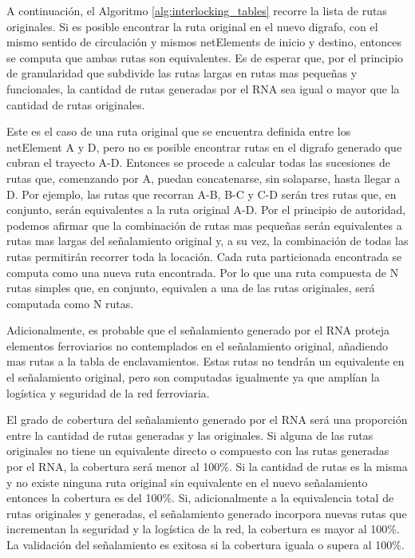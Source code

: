 	A continuación, el Algoritmo \ref{alg:interlocking_tables} recorre la lista de rutas originales. Si es posible encontrar la ruta original en el nuevo digrafo, con el mismo sentido de circulación y mismos netElements de inicio y destino, entonces se computa que ambas rutas son equivalentes. Es de esperar que, por el principio de granularidad que subdivide las rutas largas en rutas mas pequeñas y funcionales, la cantidad de rutas generadas por el RNA sea igual o mayor que la cantidad de rutas originales.
	
	Este es el caso de una ruta original que se encuentra definida entre los netElement A y D, pero no es posible encontrar rutas en el digrafo generado que cubran el trayecto A-D. Entonces se procede a calcular todas las sucesiones de rutas que, comenzando por A, puedan concatenarse, sin solaparse, hasta llegar a D. Por ejemplo, las rutas que recorran A-B, B-C y C-D serán tres rutas que, en conjunto, serán equivalentes a la ruta original A-D. Por el principio de autoridad, podemos afirmar que la combinación de rutas mas pequeñas serán equivalentes a rutas mas largas del señalamiento original y, a su vez, la combinación de todas las rutas permitirán recorrer toda la locación. Cada ruta particionada encontrada se computa como una nueva ruta encontrada. Por lo que una ruta compuesta de N rutas simples que, en conjunto, equivalen a una de las rutas originales, será computada como N rutas.
	
	Adicionalmente, es probable que el señalamiento generado por el RNA proteja elementos ferroviarios no contemplados en el señalamiento original, añadiendo mas rutas a la tabla de enclavamientos. Estas rutas no tendrán un equivalente en el señalamiento original, pero son computadas igualmente ya que amplían la logística y seguridad de la red ferroviaria.
	
	El grado de cobertura del señalamiento generado por el RNA será una proporción entre la cantidad de rutas generadas y las originales. Si alguna de las rutas originales no tiene un equivalente directo o compuesto con las rutas generadas por el RNA, la cobertura será menor al 100\%. Si la cantidad de rutas es la misma y no existe ninguna ruta original sin equivalente en el nuevo señalamiento entonces la cobertura es del 100\%. Si, adicionalmente a la equivalencia total de rutas originales y generadas, el señalamiento generado incorpora nuevas rutas que incrementan la seguridad y la logística de la red, la cobertura es mayor al 100\%. La validación del señalamiento es exitosa si la cobertura iguala o supera al 100\%.
	
	
	
	
	
	
	
	
	
	
	
	
	
	
	
	
	